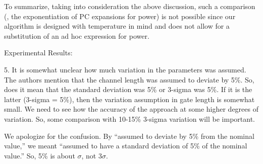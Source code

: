 \begin{authors}
To summarize, taking into consideration the above discussion, such a comparison (\ie, the exponentiation of PC expansions for power) is not possible since our algorithm is designed with temperature in mind and does not allow for a substitution of an ad hoc expression for power.



\end{authors}

\begin{reviewer}
Experimental Results:

5. It is somewhat unclear how much variation in the parameters was assumed. The authors mention that the channel length was assumed to deviate by 5\%. So, does it mean that the standard deviation was 5\% or 3-sigma was 5\%. If it is the latter (3-sigma = 5\%), then the variation assumption in gate length is somewhat small. We need to see how the accuracy of the approach at some higher degrees of variation. So, some comparison with 10-15\% 3-sigma variation will be important.
\end{reviewer}
\begin{authors}
We apologize for the confusion.
By ``assumed to deviate by 5\% from the nominal value,'' we meant ``assumed to have a standard deviation of 5\% of the nominal value.''
So, 5\% is about $\sigma$, not $3 \sigma$.

\end{authors}


